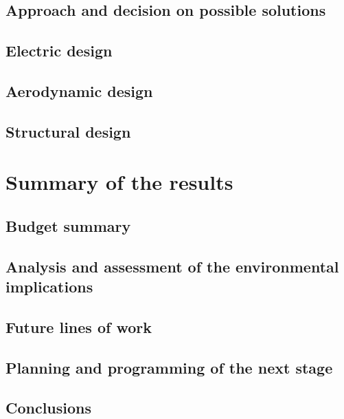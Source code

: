 \documentclass[11pt, a4paper, twoside]{book}
\begin{document}
	
	
	\section{Approach and decision on possible solutions}
	
	
	
	\newpage
	\section{Electric design}
	
	
	
	
	\newpage
	\section{Aerodynamic design}
	
	
	\section{Structural design}
	

\chapter{Summary of the results}

\section{Budget summary}

\section{Analysis and assessment of the environmental implications}

\section{Future lines of work}

\section{Planning and programming of the next stage}

\section{Conclusions}





\raggedleft

\end{document}
